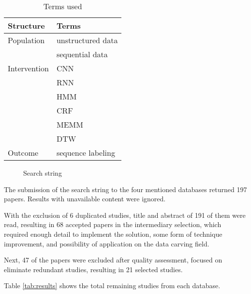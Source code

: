 \begin{table*}[!ht]
    \centering
    \begin{tabular}{ l  l  }
      Structure 	& Terms 		 \\
      \hline\hline
      Population 	& unstructured data \\   
                    & sequential data \\
      \hline
      Intervention 	& CNN \\
                    & RNN \\
                    & HMM \\
                    & CRF \\
                    & MEMM \\
                    & DTW \\
      \hline
      Outcome 		& sequence labeling \\
      \hline
    \end{tabular}
    \caption{Terms used}
    \label{tab:terms}
\end{table*}

\begin{figure}[!ht]
  \centering
  \caption{Search string}
  \label{fig:searchstring}
\end{figure}
	
The submission of the search string to the four mentioned databases returned 197 papers.
Results with unavailable content were ignored.

With the exclusion of 6 duplicated studies, title and abstract of 191 of them were read, resulting in 68 accepted papers in the intermediary selection, which required enough detail to implement the solution, some form of technique improvement, and possibility of application on the data carving field.

Next, 47 of the papers were excluded after quality assessment, focused on eliminate redundant studies, resulting in 21 selected studies.

Table 
\ref{tab:results}
shows the total remaining studies from each database.


